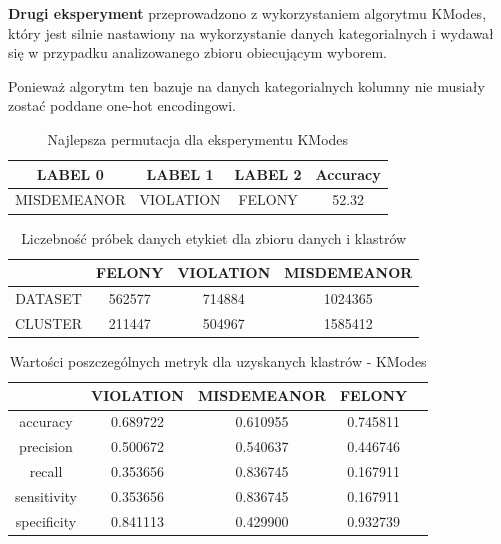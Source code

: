 \documentclass{classrep}
\begin{document}
{{{                \textbf{Drugi eksperyment} przeprowadzono z wykorzystaniem algorytmu
                KModes, który jest silnie nastawiony na wykorzystanie danych
                kategorialnych i wydawał się w przypadku analizowanego zbioru
                obiecującym wyborem.

                Ponieważ algorytm ten bazuje na danych kategorialnych kolumny nie
                musiały zostać poddane one-hot encodingowi.
                
                \begin{table}[!htbp]
                \centering
                \begin{tabular}{|c|c|c|c|}
                    \hline
                    LABEL 0 & LABEL 1 & LABEL 2 & Accuracy \\ \hline
                    MISDEMEANOR  & VIOLATION  & FELONY  & 52.32 \\
                    \hline
                \end{tabular}
                \caption{Najlepsza permutacja dla eksperymentu KModes}
                \label{tab:kmodes_lab}
                \end{table}
                
                \begin{table}[!htbp]
                \centering
                \begin{tabular}{|c|c|c|c|}
                    \hline
                    & FELONY  & VIOLATION  & MISDEMEANOR \\ \hline
                    DATASET & 562577 & 714884 & 1024365 \\
                    CLUSTER & 211447 & 504967 & 1585412 \\ 
                    \hline
                \end{tabular}
                \caption{Liczebność próbek danych etykiet dla zbioru danych i klastrów}
                \label{tab:kmodes_samples}
                \end{table}
                
                \begin{table}[!htbp]
                \centering
                \begin{tabular}{|c|c|c|c|c|}
                    \hline
                 & VIOLATION  &  MISDEMEANOR & FELONY \\ \hline
                accuracy      &  0.689722     & 0.610955 & 0.745811      \\
                precision   &        0.500672  &   0.540637 & 0.446746 \\
                recall       &       0.353656  &   0.836745 & 0.167911 \\
                sensitivity    &       0.353656  &   0.836745 & 0.167911   \\
                specificity   &      0.841113  &   0.429900 & 0.932739 \\
                    \hline
                \end{tabular}
                \caption{Wartości poszczególnych metryk dla uzyskanych klastrów - KModes}
                \label{tab:kmodes_metrics}
                \end{table}

}}}
\end{document}
